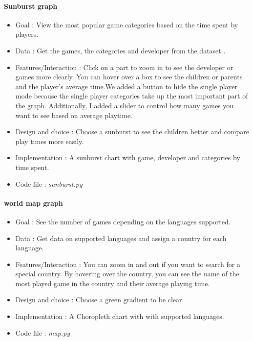 \documentclass{article}
\begin{document}
    \paragraph{Sunburst graph}
    \begin{itemize}
        \item Goal : View the most popular game categories based on the time spent by players.
        \item Data : Get the games, the categories and developer from the dataset .
        \item Features/Interaction : Click on a part to zoom in to see the developer or games more clearly. You can hover over a box to see the children or parents and the player's average time.We added a button to hide the single player mode because the single player categories take up the most important part of the graph. Additionally, I added a slider to control how many games you want to see based on average playtime.
        \item Design and choice : Choose a sunburst to see the children better and compare play times more easily.
        \item Implementation : A sunburst chart with game, developer and categories by time spent.
        \item Code file : \textit{sunburst.py}
    \end{itemize}
    
    \paragraph{world map graph}
    \begin{itemize}
        \item Goal : See the number of games depending on the languages supported.
        \item Data : Get data on supported languages and assign a country for each language.
        \item Features/Interaction : You can zoom in and out if you want to search for a special country. By hovering over the country, you can see the name of the most played game in the country and their average playing time.
        \item Design and choice : Choose a green gradient to be clear.
        \item Implementation : A Choropleth chart with with supported languages.
        \item Code file : \textit{map.py}
    \end{itemize}
    
\end{document}

